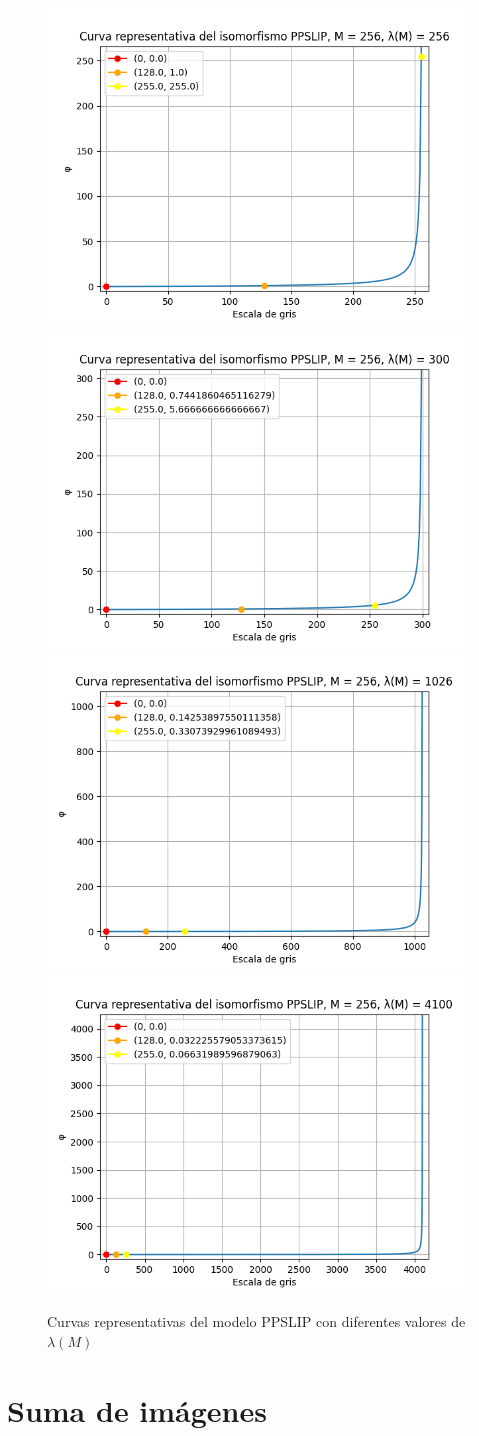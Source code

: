 \begin{figure}
	\begin{center}
		\includegraphics[width=5.0 cm]{images/ppslip_curves/ppslip_curve_256.png}
		\includegraphics[width=5.0 cm]{images/ppslip_curves/ppslip_curve_300.png}
		\includegraphics[width=5.0 cm]{images/ppslip_curves/ppslip_curve_1026.png}
		\includegraphics[width=5.0 cm]{images/ppslip_curves/ppslip_curve_4100.png}
		\caption{Curvas representativas del modelo PPSLIP con diferentes valores de $\lambda(M)$}
	\end{center}
\end{figure}

\section{Suma de im\'agenes}
